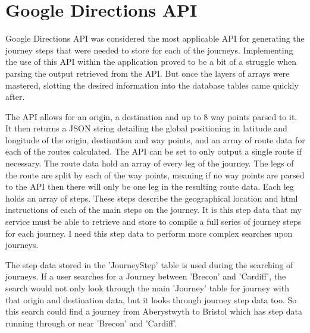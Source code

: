 \section{Google Directions API}
	Google Directions API was considered the most applicable API for generating the journey steps that were needed to store for each of the journeys. Implementing the use of this API within the application proved to be a bit of a struggle when parsing the output retrieved from the API. But once the layers of arrays were mastered, slotting the desired information into the database tables came quickly after. 
	
	The API allows for an origin, a destination and up to 8 way points parsed to it. It then returns a JSON string detailing the global positioning in latitude and longitude of the origin, destination and way points, and an array of route data for each of the routes calculated. The API can be set to only output a single route if necessary. The route data hold an array of every leg of the journey. The legs of the route are split by each of the way points, meaning if no way points are parsed to the API then there will only be one leg in the resulting route data. Each leg holds an array of steps. These steps describe the geographical location and html instructions of each of the main steps on the journey. It is this step data that my service must be able to retrieve and store to compile a full series of journey steps for each journey. I need this step data to perform more complex searches upon journeys.
	
	The step data stored in the 'Journey\textunderscore Step' table is used during the searching of journeys. If a user searches for a Journey between 'Brecon' and 'Cardiff', the search would not only look through the main 'Journey' table for journey with that origin and destination data, but it looks through journey step data too. So this search could find a journey from Aberystwyth to Bristol which has step data running through or near 'Brecon' and 'Cardiff'. 
	
